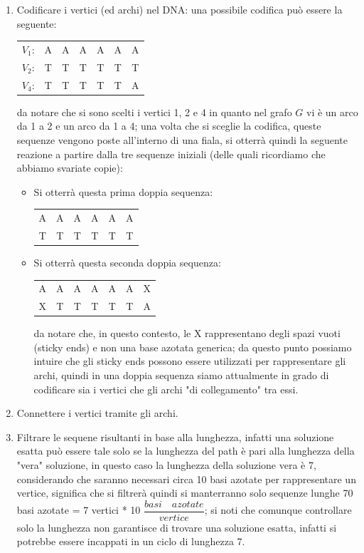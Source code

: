 \documentclass[12pt,a4paper]{report}
\begin{document}
\begin{enumerate}
\item Codificare i vertici (ed archi) nel DNA: una possibile codifica può essere la seguente: 
\begin{center}
\begin{tabular}{ c c c c c c c }
 $V_{1}$: & A & A & A & A & A & A \\ 
 $V_{2}$: & T & T & T & T & T & T \\
 $V_{4}$: & T & T & T & T & T & A
\end{tabular}
\end{center}
da notare che si sono scelti i vertici 1, 2 e 4 in quanto nel grafo $G$ vi è un arco da 1 a 2 e un arco da 1 a 4; una volta che si sceglie la codifica, queste sequenze vengono poste all'interno di una fiala, si otterrà quindi la seguente reazione a partire dalla tre sequenze iniziali (delle quali ricordiamo che abbiamo svariate copie):
\begin{itemize}
\item Si otterrà questa prima doppia sequenza:
\begin{center}
\begin{tabular}{ c c c c c c }
 A & A & A & A & A & A \\ 
 T & T & T & T & T & T \\
\end{tabular}
\end{center}
\item Si otterrà questa seconda doppia sequenza:
\begin{center}
\begin{tabular}{ c c c c c c c }
 A & A & A & A & A & A & X \\ 
 X & T & T & T & T & T & A
\end{tabular}
\end{center}
da notare che, in questo contesto, le X rappresentano degli spazi vuoti (sticky ends) e non una base azotata generica; da questo punto possiamo intuire che gli sticky ends possono essere utilizzati per rappresentare gli archi, quindi in una doppia sequenza siamo attualmente in grado di codificare sia i vertici che gli archi "di collegamento" tra essi.
\end{itemize}
\item Connettere i vertici tramite gli archi.
\item Filtrare le sequene risultanti in base alla lunghezza, infatti una soluzione esatta può essere tale solo se la lunghezza del path è pari alla lunghezza della "vera" soluzione, in questo caso la lunghezza della soluzione vera è 7, considerando che saranno necessari circa 10 basi azotate per rappresentare un vertice, significa che si filtrerà quindi si manterranno solo sequenze lunghe 70 basi azotate = 7 vertici * 10 $\dfrac{basi \quad azotate}{vertice}$; si noti che comunque controllare solo la lunghezza non garantisce di trovare una soluzione esatta, infatti si potrebbe essere incappati in un ciclo di lunghezza 7.
\end{enumerate}
\end{document}
